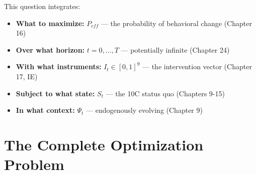 This question integrates:
\begin{itemize}
\item \textbf{What to maximize:} $P_{eff}$ --- the probability of behavioral change (Chapter 16)
\item \textbf{Over what horizon:} $t = 0, \ldots, T$ --- potentially infinite (Chapter 24)
\item \textbf{With what instruments:} $I_t \in [0,1]^9$ --- the intervention vector (Chapter 17, IE)
\item \textbf{Subject to what state:} $S_t$ --- the 10C status quo (Chapters 9-15)
\item \textbf{In what context:} $\Psi_t$ --- endogenously evolving (Chapter 9)
\end{itemize}

\section{The Complete Optimization Problem}
\label{sec:mp-problem}

